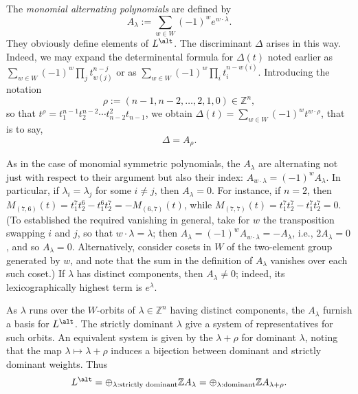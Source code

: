 \documentclass[reqno]{amsart} 
\begin{document}
The \emph{monomial alternating polynomials} are defined by
\begin{equation*}
  A_{\lambda} := \sum_{w \in W} (-1)^w e^{w \cdot \lambda}.
\end{equation*}
They obviously define elements of $L^{\alt}$.  The discriminant $\Delta$ arises in this way.  Indeed, we may expand the determinental formula for $\Delta(t)$ noted earlier as $\sum_{w \in W} (-1)^w \prod_j t_{w(j)}^{n-j}$ or as $\sum_{w \in W} (-1)^w \prod_i t_{i}^{n-w(i)}$.  Introducing the notation
\begin{equation}\label{eq:}
  \rho := (n-1,n-2,\dotsc,2,1,0) \in \mathbb{Z}^n,
\end{equation}
so that $t^\rho = t_1^{n-1} t_2^{n-2} \dotsb t_{n-2}^2 t_{n-1}$, we obtain $\Delta(t) = \sum_{w \in W} (-1)^w t^{w \cdot \rho}$, that is to say,
\begin{equation*}
  \Delta = A_{\rho}.
\end{equation*}

As in the case of monomial symmetric polynomials, the $A_\lambda$ are alternating not just with respect to their argument but also their index: $A_{w \cdot \lambda} = (-1)^w A_\lambda$.  In particular, if $\lambda_i = \lambda_j$ for some $i \neq j$, then $A_{\lambda} = 0$.  For instance, if $n = 2$, then $M_{(7,6)}(t) = t_1^7 t_2^6 - t_1^6 t_2^7 = - M_{(6,7)}(t)$, while $M_{(7,7)}(t) = t_1^7 t_2^7 - t_1^7 t_2^7 = 0$.  (To established the required vanishing in general, take for $w$ the transposition swapping $i$ and $j$, so that $w \cdot \lambda = \lambda$; then $A_\lambda = (-1)^w A_{w \cdot \lambda} = - A_\lambda$, i.e., $2 A_\lambda = 0$, and so $A_\lambda = 0$.  Alternatively, consider cosets in $W$ of the two-element group generated by $w$, and note that the sum in the definition of $A_{\lambda}$ vanishes over each such coset.)  If $\lambda$ has distinct components, then $A_\lambda \neq 0$; indeed, its lexicographically highest term is $e^{\lambda}$.

As $\lambda$ runs over the $W$-orbits of $\lambda \in \mathbb{Z}^n$ having distinct components, the $A_\lambda$ furnish a basis for $L^{\alt}$.  The strictly dominant $\lambda$ give a system of representatives for such orbits.  An equivalent system is given by the $\lambda + \rho$ for dominant $\lambda$, noting that the map $\lambda \mapsto \lambda + \rho$ induces a bijection between dominant and strictly dominant weights.  Thus
\begin{equation}\label{eq:}
  L^{\alt}
  = \oplus_{\lambda:\text{strictly dominant}}
  \mathbb{Z} A_\lambda
  = \oplus_{\lambda:\text{dominant}}
  \mathbb{Z} A_{\lambda + \rho}.
\end{equation}
\end{document}
